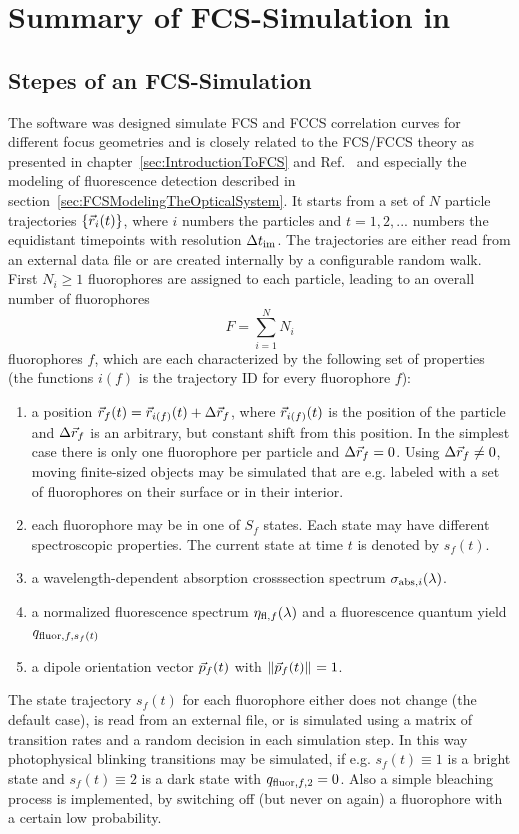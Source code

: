 
\chapter{Summary of FCS-Simulation in \df}
\label{sec:SummaryOfDf}
\label{sec:IntroductionToDf}
\section{Stepes of an FCS-Simulation}
\label{sec:StepesOfAnFCSSimulation}

The software \df was designed simulate FCS and FCCS correlation curves for different focus geometries and is closely related to the FCS/FCCS theory as presented in  chapter~\ref{sec:IntroductionToFCS} and Ref.~\cite{KRIEGERPHD2014} and especially the modeling of fluorescence detection described in section~\ref{sec:FCSModelingTheOpticalSystem}. It starts from a set of $N$ particle trajectories $\{\vec{r}_i(t)\}$, where $i$ numbers the particles and $t=1,2,...$ numbers the equidistant timepoints with resolution $\Delta t_{\text{im}}$. The trajectories are either read from an external data file or are created internally by a configurable random walk. First $N_i\geq 1$ fluorophores are assigned to each particle, leading to an overall number of fluorophores \[  F=\sum\limits_{i=1}^NN_i  \] fluorophores $f$, which are each  characterized by the following set of properties (the functions $i(f)$ is the trajectory ID for every fluorophore $f$):
\begin{enumerate}
	\item a position $\vec{r}_f(t)=\vec{r}_{i(f)}(t)+\Delta\vec{r}_{f}$, where $\vec{r}_{i(f)}(t)$ is the position of the particle and $\Delta\vec{r}_f$ is an arbitrary, but constant shift from this position. In the simplest case there is only one fluorophore per particle and $\Delta\vec{r}_f=0$. Using $\Delta\vec{r}_f\neq0$, moving finite-sized objects may be simulated that are e.g. labeled with a set of fluorophores on their surface or in their interior.
  \item each fluorophore may be in one of $S_f$ states. Each state may have different spectroscopic properties. The current state at time $t$ is denoted by $s_f(t)$. 
  \item a wavelength-dependent absorption crosssection spectrum $\sigma_{{\text{abs}},i}(\lambda)$.
  \item a normalized fluorescence spectrum $\eta_{{\text{fl}},f}(\lambda)$ and a fluorescence quantum yield $q_{{\text{fluor}},f,s_f(t)}$
  \item a dipole orientation vector $\vec{p}_f(t)$ with $\|\vec{p}_f(t)\|_{}=1$.
\end{enumerate}
The state trajectory $s_f(t)$ for each fluorophore either does not change (the default case), is read from an external file, or is simulated using a matrix of transition rates and a random decision in each simulation step. In this way photophysical blinking transitions may be simulated, if e.g. $s_f(t)\equiv1$ is a bright state and $s_f(t)\equiv2$ is a dark state with $q_{{\text{fluor}},f,2}=0$. Also a simple bleaching process is implemented, by switching off (but never on again) a fluorophore with a certain low probability.

